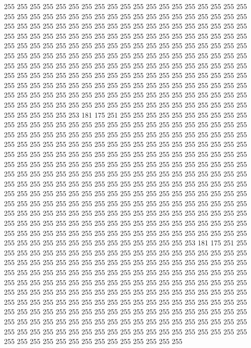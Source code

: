 255 255 255 255 255 255 255 255 255 255 255 255 255 255 255 255 255 255 255 255
255 255 255 255 255 255 255 255 255 255 255 255 255 255 255 255 255 255 255 255
255 255 255 255 255 255 255 255 255 255 255 255 255 255 255 255 255 255 255 255
255 255 255 255 255 255 255 255 255 255 255 255 255 255 255 255 255 255 255 255
255 255 255 255 255 255 255 255 255 255 255 255 255 255 255 255 255 255 255 255
255 255 255 255 255 255 255 255 255 255 255 255 255 255 255 255 255 255 255 255
255 255 255 255 255 255 255 255 255 255 255 255 255 255 255 255 255 255 255 255
255 255 255 255 255 255 255 255 255 255 255 255 255 255 255 255 255 255 255 255
255 255 255 255 255 255 255 255 255 255 255 255 255 255 255 255 255 255 255 255
255 255 255 255 255 255 255 255 255 255 255 255 255 255 255 255 255 255 255 255
255 255 255 255 255 255 255 255 255 255 255 255 255 255 253 181 175 251 255 255
255 255 255 255 255 255 255 255 255 255 255 255 255 255 255 255 255 255 255 255
255 255 255 255 255 255 255 255 255 255 255 255 255 255 255 255 255 255 255 255
255 255 255 255 255 255 255 255 255 255 255 255 255 255 255 255 255 255 255 255
255 255 255 255 255 255 255 255 255 255 255 255 255 255 255 255 255 255 255 255
255 255 255 255 255 255 255 255 255 255 255 255 255 255 255 255 255 255 255 255
255 255 255 255 255 255 255 255 255 255 255 255 255 255 255 255 255 255 255 255
255 255 255 255 255 255 255 255 255 255 255 255 255 255 255 255 255 255 255 255
255 255 255 255 255 255 255 255 255 255 255 255 255 255 255 255 255 255 255 255
255 255 255 255 255 255 255 255 255 255 255 255 255 255 255 255 255 255 255 255
255 255 255 255 255 255 255 255 255 255 255 255 255 255 255 255 255 255 255 255
255 255 255 255 255 255 255 255 255 255 255 255 255 255 255 255 255 255 255 255
255 255 255 255 255 255 255 255 255 255 255 255 255 255 255 255 255 255 255 255
255 255 255 255 255 255 255 255 255 255 253 181 175 251 255 255 255 255 255 255
255 255 255 255 255 255 255 255 255 255 255 255 255 255 255 255 255 255 255 255
255 255 255 255 255 255 255 255 255 255 255 255 255 255 255 255 255 255 255 255
255 255 255 255 255 255 255 255 255 255 255 255 255 255 255 255 255 255 255 255
255 255 255 255 255 255 255 255 255 255 255 255 255 255 255 255 255 255 255 255
255 255 255 255 255 255 255 255 255 255 255 255 255 255 255 255 255 255 255 255
255 255 255 255 255 255 255 255 255 255 255 255 255 255 255 255 255 255 255 255
255 255 255 255 255 255 255 255 255 255 255 255 255 255 255 255 255 255 255 255
255 255 255 255 255 255 255 255 255 255 255 255 255 255 255 255 255 255 255 255
255 255 255 255 255 255 255 255 255 255 255 255 255 255 255 255 255 255 255 255
